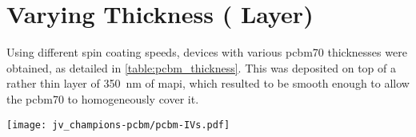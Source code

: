 \section{Varying  Thickness ( Layer)}
Using different spin coating speeds, devices with various \gls{pcbm70} thicknesses were obtained, as detailed in \cref{table:pcbm_thickness}.
This was deposited on top of a rather thin layer of \SI{350}{\nm} of \gls{mapi}, which resulted to be smooth enough to allow the \gls{pcbm70} to homogeneously cover it.

\begin{SCfigure}
	\centering
	\texttt{[image: jv\_champions-pcbm/pcbm-IVs.pdf]}
	\label{fig:thicknesses-jv_champions-pcbm}
\end{SCfigure}

